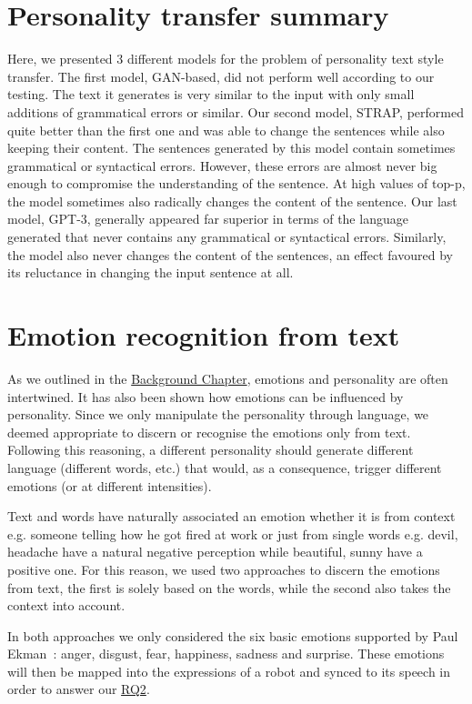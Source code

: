 \documentclass[nomenclature, english, biblatex]{kththesis}
\begin{document}
\section{Personality transfer summary}
Here, we presented 3 different models for the problem of personality text style transfer. The first model, GAN-based, did not perform well according to our testing. The text it generates is very similar to the input with only small additions of grammatical errors or similar. Our second model, STRAP, performed quite better than the first one and was able to change the sentences while also keeping their content. The sentences generated by this model contain sometimes grammatical or syntactical errors. However, these errors are almost never big enough to compromise the understanding of the sentence. At high values of top-p, the model sometimes also radically changes the content of the sentence. Our last model, GPT-3, generally appeared far superior in terms of the language generated that never contains any grammatical or syntactical errors. Similarly, the model also never changes the content of the sentences, an effect favoured by its reluctance in changing the input sentence at all.
\section{Emotion recognition from text}
\label{sec:emotion_methods}
As we outlined in the \hyperref[ch:background]{Background Chapter}, emotions and personality are often intertwined. It has also been shown how emotions can be influenced by personality. Since we only manipulate the personality through language, we deemed appropriate to discern or recognise the emotions only from text. Following this reasoning, a different personality should generate different language (different words, etc.) that would, as a consequence, trigger different emotions (or at different intensities). 

Text and words have naturally associated an emotion whether it is from context e.g. someone telling how he got fired at work or just from single words e.g. devil, headache have a natural negative perception while beautiful, sunny have a positive one. For this reason, we used two approaches to discern the emotions from text, the first is solely based on the words, while the second also takes the context into account.

In both approaches we only considered the six basic emotions supported by Paul Ekman~\cite{ekman1999basic}: anger, disgust, fear, happiness, sadness and surprise. These emotions will then be mapped into the expressions of a robot and synced to its speech in order to answer our \hyperlink{rqs:2}{RQ2}.
\end{document}
